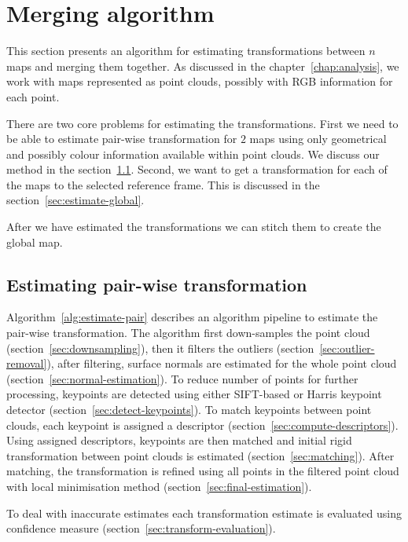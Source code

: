 \chapter{Merging algorithm}
\label{chap:mergingalgorithm}


This section presents an algorithm for estimating transformations between $n$ maps and merging them together. As discussed in the chapter~\ref{chap:analysis}, we work with maps represented as point clouds, possibly with \gls{RGB} information for each point.

There are two core problems for estimating the transformations. First we need to be able to estimate pair-wise transformation for $2$ maps using only geometrical and possibly colour information available within point clouds. We discuss our method in the section~\ref{sec:estimate-pair-wise}. Second, we want to get a transformation for each of the maps to the selected reference frame. This is discussed in the section~\ref{sec:estimate-global}.

After we have estimated the transformations we can stitch them to create the global map.

\section{Estimating pair-wise transformation}
\label{sec:estimate-pair-wise}

Algorithm~\ref{alg:estimate-pair} describes an algorithm pipeline to estimate the pair-wise transformation. The algorithm first down-samples the point cloud (section~\ref{sec:downsampling}), then it filters the outliers (section~\ref{sec:outlier-removal}), after filtering, surface normals are estimated for the whole point cloud (section~\ref{sec:normal-estimation}). To reduce number of points for further processing, keypoints are detected using either \gls{SIFT}-based or Harris keypoint detector (section~\ref{sec:detect-keypoints}). To match keypoints between point clouds, each keypoint is assigned a descriptor (section~\ref{sec:compute-descriptors}). Using assigned descriptors, keypoints are then matched and initial rigid transformation between point clouds is estimated (section~\ref{sec:matching}). After matching, the transformation is refined using all points in the filtered point cloud with local minimisation method (section~\ref{sec:final-estimation}).

To deal with inaccurate estimates each transformation estimate is evaluated using confidence measure (section~\ref{sec:transform-evaluation}).


